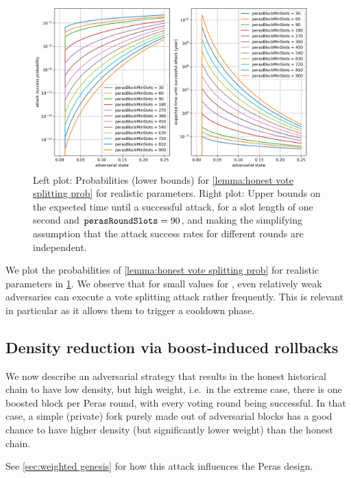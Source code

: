 \begin{figure}[h]
  \includegraphics[width=0.95\textwidth]{./appendix/plot-honest-vote-splitting.png}
  \centering
  \caption{Left plot: Probabilities (lower bounds) for \cref{lemma:honest vote splitting prob} for realistic parameters. Right plot: Upper bounds on the expected time until a successful attack, for a slot length of one second and $\mathtt{perasRoundSlots} = 90$, and making the simplifying assumption that the attack success rates for different rounds are independent.}\label{fig:honest vote splitting prob}
\end{figure}
We plot the probabilities of \cref{lemma:honest vote splitting prob} for realistic parameters in \cref{fig:honest vote splitting prob}.
We observe that for small values for \perasBlockMinSlots{}, even relatively weak adversaries can execute a vote splitting attack rather frequently.
This is relevant in particular as it allows them to trigger a cooldown phase.

\subsection{Density reduction via boost-induced rollbacks}\label{sec:density reduction via boost-induced rollbacks}

We now describe an adversarial strategy that results in the honest historical chain to have low density, but high weight, i.e.\ in the extreme case, there is one boosted block per Peras round, with every voting round being successful.
In that case, a simple (private) fork purely made out of adversarial blocks has a good chance to have higher density (but significantly lower weight) than the honest chain.

See \cref{sec:weighted genesis} for how this attack influences the Peras design.

